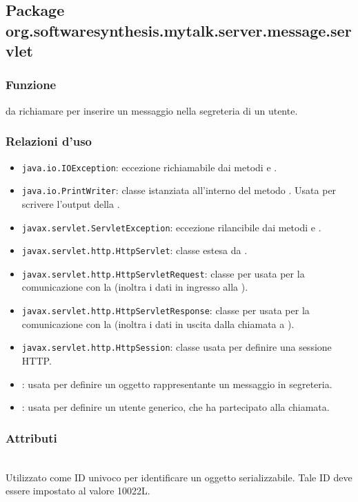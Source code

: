 \subsection{Package org.softwaresynthesis.mytalk.server.message.servlet}\label{sec:messageServlet}


\subsubsection*{Funzione}
 da richiamare per inserire un messaggio nella segreteria di un utente.

\subsubsection*{Relazioni d'uso}
\begin{itemize}
	\item \texttt{java.io.IOException}: eccezione richiamabile dai metodi  e .
	\item \texttt{java.io.PrintWriter}: classe istanziata all'interno del metodo . Usata per scrivere l'output della .
	\item \texttt{javax.servlet.ServletException}: eccezione rilancibile dai metodi  e .
	\item \texttt{javax.servlet.http.HttpServlet}: classe estesa da .
	\item \texttt{javax.servlet.http.HttpServletRequest}:  classe per usata per la comunicazione con la  (inoltra i dati in ingresso alla ).
	\item \texttt{javax.servlet.http.HttpServletResponse}: classe per usata per la comunicazione con la  (inoltra i dati in uscita dalla chiamata a ).
	\item \texttt{javax.servlet.http.HttpSession}: classe usata per definire una sessione HTTP.
	\item {}: usata per definire un oggetto rappresentante un messaggio in segreteria.
	\item {}: usata per definire un utente generico, che ha partecipato alla chiamata.
\end{itemize}

\subsubsection*{Attributi}
\begin{description}
  \item{}\\
  Utilizzato come ID univoco per identificare un oggetto serializzabile. Tale ID deve essere impostato al valore 10022L.
\end{description}

